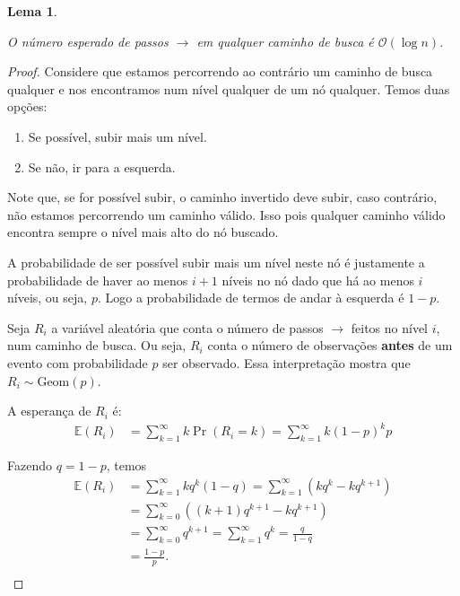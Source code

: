 \documentclass[paper=a4, fontsize=11pt]{scrartcl} %
\newtheorem{lemma}[theorem]{Lema}
\numberwithin{equation}{section}
\numberwithin{figure}{section}
\numberwithin{table}{section}
\numberwithin{definition}{section}
\numberwithin{theorem}{section}
\numberwithin{property}{section}
\numberwithin{proposition}{section}
\newcommand{\cO}{\ensuremath{\mathcal{O}}}
\newcommand{\Exp}{\ensuremath{{\mathbb{E}}}\xspace}
\begin{document}
\begin{lemma} \label{lemma:rightarrow}

O número esperado de passos $\rightarrow$ em qualquer caminho de busca é $\cO(\log n)$.

\end{lemma}

\begin{proof}
Considere que estamos percorrendo ao contrário um caminho de busca qualquer e nos encontramos num nível qualquer 
de um nó qualquer. Temos duas opções:
\begin{enumerate}[noitemsep]
  \item Se possível, subir mais um nível. 
  \item Se não, ir para a esquerda.
\end{enumerate}

Note que, se for possível subir, o caminho invertido deve subir, caso contrário, não estamos percorrendo um 
caminho válido. Isso pois qualquer caminho válido encontra sempre o nível mais alto do nó buscado.

A probabilidade de ser possível subir mais um nível neste nó é justamente a probabilidade de haver ao menos
$i + 1$ níveis no nó dado que há ao menos $i$ níveis, ou seja, $p$. Logo a probabilidade de termos de andar à
esquerda é $1 - p$.

Seja $R_i$ a variável aleatória que conta o número de passos $\rightarrow$ feitos no nível $i$, num 
caminho de busca. Ou seja, $R_i$ conta o número de observações \textbf{antes} de um evento com probabilidade 
$p$ ser observado. Essa interpretação mostra que $R_i \sim \text{Geom}(p)$. 

A esperança de $R_i$ é:
\begin{align*}
\Exp(R_i)
  &= \sum_{k = 1}^{\infty} k \Pr(R_i = k)= \sum_{k = 1}^{\infty} k (1 - p)^{k} p 
\end{align*}

Fazendo  $q = 1 - p$, temos
\begin{align*}
\Exp(R_i)
  &= \sum_{k = 1}^{\infty} k q^{k} (1 - q) 
    = \sum_{k = 1}^{\infty} \left( k q^{k}  - k q^{k+1} \right)  \\
  &= \sum_{k = 0}^{\infty} \left( (k+1) q^{k+1}  - k q^{k+1} \right) \\
  &= \sum_{k = 0}^{\infty} q^{k+1} 
    = \sum_{k = 1}^{\infty} q^{k}  
    = \frac{q}{1-q} \\
  &= \frac{1 - p}{p}. \\
\end{align*}


\end{proof}
\end{document}
